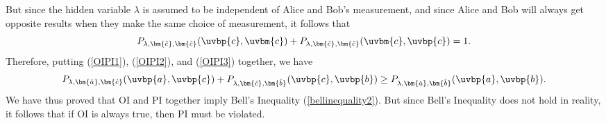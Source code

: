 \documentclass[12pt]{report}
\begin{document}
But since the hidden variable $\lambda$ is assumed to be independent of Alice and Bob's measurement, and since Alice and Bob will always get opposite results when they make the same choice of measurement, it follows that 
\begin{equation}\label{OIPI3}
P_{\lambda,\bm{\hat{c}},\bm{\hat{c}}}(\uvbp{c},\uvbm{c})+P_{\lambda,\bm{\hat{c}},\bm{\hat{c}}}(\uvbm{c},\uvbp{c})=1.
\end{equation}
Therefore, putting (\ref{OIPI1}), (\ref{OIPI2}), and (\ref{OIPI3}) together, we have
\begin{equation}
P_{\lambda,\bm{\hat{a}},\bm{\hat{c}}}(\uvbp{a},\uvbp{c})+P_{\lambda,\bm{\hat{c}},\bm{\hat{b}}}(\uvbp{c},\uvbp{b})\geq P_{\lambda,\bm{\hat{a}},\bm{\hat{b}}}(\uvbp{a},\uvbp{b}).
\end{equation}
We have thus proved that OI and PI together imply Bell's Inequality (\ref{bellinequality2}). But since Bell's Inequality does not hold in reality, it follows that if OI is always true, then PI must be violated.\label{OIPIproofend}
\end{document}
